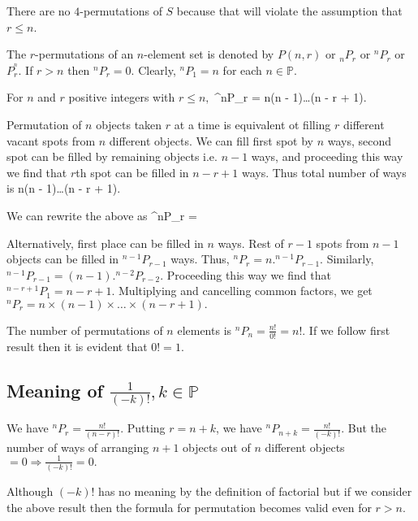 There are no $4$-permutations of $S$ because that will violate the assumption that $r\leq n$.

The $r$-permutations of an $n$-element set is denoted by $P(n, r)$ or ${}_nP_r$ or ${}^nP_r$ or $P_r^^n$. If $r > n$ then ${}^nP_r =
0$. Clearly, ${}^nP_1 = n$ for each $n\in \mathbb{P}$.

For $n$ and $r$ positive integers with $r\leq n,$ \startformula {}^nP_r = n\times(n - 1)\times\ldots\times(n - r + 1).\stopformula

Permutation of $n$ objects taken $r$ at a time is equivalent ot filling $r$ different vacant spots from $n$ different objects. We
can fill first spot by $n$ ways, second spot can be filled by remaining objects i.e. $n - 1$ ways, and proceeding this way we find
that $r$th spot can be filled in $n - r + 1$ ways. Thus total number of ways is \startformula n\times(n - 1)\times\ldots(n - r + 1).\stopformula

We can rewrite the above as \startformula {}\stopformula
\startformula {}^nP_r = \stopformula

Alternatively, first place can be filled in $n$ ways. Rest of $r - 1$ spots from $n - 1$ objects can be filled in ${}^{n - 1}P_{r -
1}$ ways. Thus, ${}^nP_r = n.{}^{n - 1}P_{r - 1}$. Similarly, ${}^{n - 1}P_{r - 1} = (n - 1).{}^{n - 2}P_{r - 2}$. Proceeding this
way we find that ${}^{n - r + 1}P_1 = n - r + 1$. Multiplying and cancelling common factors, we get ${}^nP_r = n\times(n -
1)\times\ldots\times(n - r + 1).$

The number of permutations of $n$ elements is ${}^nP_n = \frac{n!}{0!} = n!$. If we follow first result then it is evident that $0!
= 1.$

\subsection{Meaning of $\frac{1}{(-k)!}, k\in\mathbb{P}$}
We have ${}^nP_r = \frac{n!}{(n - r)!}$. Putting $r = n + k$, we have ${}^nP_{n + k} = \frac{n!}{(-k)!}$. But the number of ways of
arranging $n + 1$ objects out of $n$ different objects $= 0 \Rightarrow \frac{1}{(-k)!} = 0.$

 Although $(-k)!$ has no meaning by the definition of factorial but if we consider the above result then the
formula for permutation becomes valid even for $r > n.$

